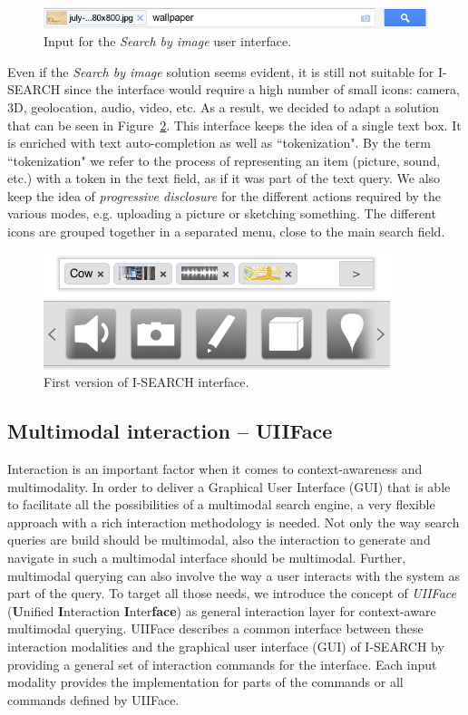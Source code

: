 \documentclass[runningheads,a4paper]{llncs} \usepackage[utf8]{inputenc}
\begin{document}
\begin{figure}[h!]
  \centering
    \includegraphics[width=0.7\linewidth]{resources/search-by-image-UI-box.png}
  \caption{Input for the \textit{Search by image} user interface.}
  \label{fig:search-by-image-box}
\end{figure}

Even if the \textit{Search by image} solution seems evident, it is still not suitable for \mbox{I-SEARCH} since the interface would require a high number of small icons: camera, 3D, geolocation, audio, video, etc.  As a result, we decided to adapt a solution that can be seen in Figure~\ref{fig:isearch-ui}. This interface keeps the idea of a single text box. It is enriched with text auto-completion as well as ``tokenization". By the term ``tokenization" we refer to the process of representing an item (picture, sound, etc.) with a token in the text field, as if it was part of the text query. We also keep the idea of \emph{progressive disclosure} for the different actions required by the various modes, e.g. uploading a picture or sketching something. The different icons are grouped together in a separated menu, close to the main search field.

\begin{figure}[h!]
  \centering
    \includegraphics[width=0.4\linewidth]{resources/isearch-UI-mobile.png}
  \caption{First version of \mbox{I-SEARCH} interface.}
  \label{fig:isearch-ui}
\end{figure}

\subsection{Multimodal interaction -- UIIFace}
Interaction is an important factor when it comes to context-awareness and multimodality. In order to deliver a Graphical User Interface (GUI) that is able to facilitate all the possibilities of a multimodal search engine, a very flexible approach with a rich interaction methodology is needed. Not only the way search queries are build should be multimodal, also the interaction to generate and navigate in such a multimodal interface should be multimodal. Further, multimodal querying can also involve the way a user interacts with the system as part of the query. To target all those needs, we introduce the concept of \emph{UIIFace} (\textbf{U}nified \textbf{I}nteraction \textbf{I}nter\textbf{face}) as general interaction layer for context-aware multimodal querying. UIIFace describes a common interface between these interaction modalities and the graphical user interface (GUI) of \mbox{I-SEARCH} by providing a general set of interaction commands for the interface. Each input modality provides the implementation for parts of the commands or all commands defined by UIIFace. 
\end{document}
